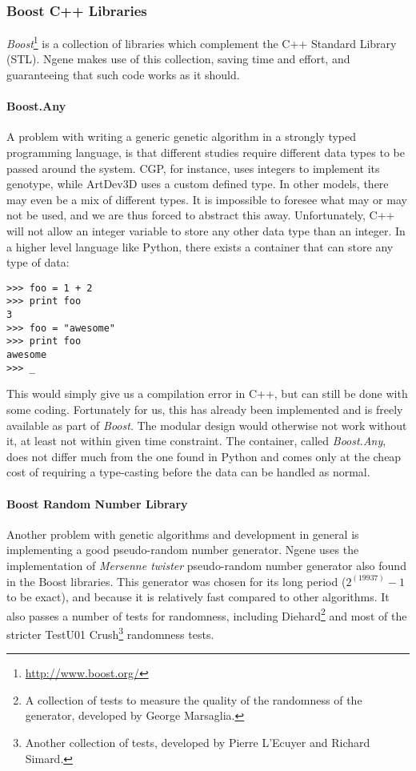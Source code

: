 \subsubsection{Boost C++ Libraries}
\emph{Boost}\footnote{\url{http://www.boost.org/}} is a collection of libraries which complement the C++ Standard Library (STL). Ngene makes use of this collection, saving time and effort, and guaranteeing that such code works as it should.

\paragraph{\textbf{Boost.Any}}\cite{henney2001}
A problem with writing a generic genetic algorithm in a strongly typed programming language, is that different studies require different data types to be passed around the system. CGP, for instance, uses integers to implement its genotype, while ArtDev3D uses a custom defined type. In other models, there may even be a mix of different types. It is impossible to foresee what may or may not be used, and we are thus forced to abstract this away. Unfortunately, C++ will not allow an integer variable to store any other data type than an integer. In a higher level language like Python, there exists a container that can store any type of data:

\begin{verbatim}
>>> foo = 1 + 2
>>> print foo
3
>>> foo = "awesome"
>>> print foo
awesome
>>> _
\end{verbatim}

This would simply give us a compilation error in C++, but can still be done with some coding. Fortunately for us, this has already been implemented and is freely available as part of \emph{Boost}. The modular design would otherwise not work without it, at least not within given time constraint. The container, called \emph{Boost.Any}, does not differ much from the one found in Python and comes only at the cheap cost of requiring a type-casting before the data can be handled as normal.

\paragraph{\textbf{Boost Random Number Library}}\cite{maurer2000}
Another problem with genetic algorithms and development in general is implementing a good pseudo-random number generator. Ngene uses the implementation of \emph{Mersenne twister} pseudo-random number generator also found in the Boost libraries. This generator was chosen for its long period ($2^(19937) - 1$ to be exact), and because it is relatively fast compared to other algorithms. It also passes a number of tests for randomness, including Diehard\footnote{A collection of tests to measure the quality of the randomness of the generator, developed by George Marsaglia.} and most of the stricter TestU01 Crush\footnote{Another collection of tests, developed by Pierre L'Ecuyer and Richard Simard.} randomness tests.


